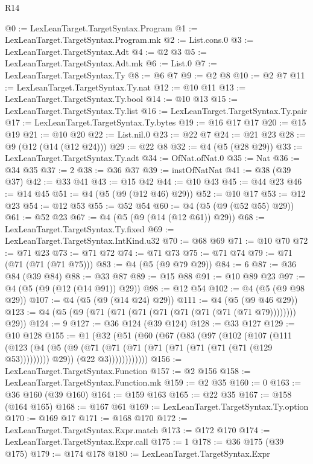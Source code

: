 \begin{lexlean}{R14}
\begin{coremodule}
@0 := LexLeanTarget.TargetSyntax.Program
@1 := LexLeanTarget.TargetSyntax.Program.mk
@2 := List.cons.{0}
@3 := LexLeanTarget.TargetSyntax.Adt
@4 := @2 @3
@5 := LexLeanTarget.TargetSyntax.Adt.mk
@6 := List.{0}
@7 := LexLeanTarget.TargetSyntax.Ty
@8 := @6 @7
@9 := @2 @8
@10 := @2 @7
@11 := LexLeanTarget.TargetSyntax.Ty.nat
@12 := @10 @11
@13 := LexLeanTarget.TargetSyntax.Ty.bool
@14 := @10 @13
@15 := LexLeanTarget.TargetSyntax.Ty.list
@16 := LexLeanTarget.TargetSyntax.Ty.pair
@17 := LexLeanTarget.TargetSyntax.Ty.bytes
@19 := @16 @17 @17
@20 := @15 @19
@21 := @10 @20
@22 := List.nil.{0}
@23 := @22 @7
@24 := @21 @23
@28 := @9 (@12 (@14 (@12 @24)))
@29 := @22 @8
@32 := @4 (@5 (@28 @29))
@33 := LexLeanTarget.TargetSyntax.Ty.adt
@34 := OfNat.ofNat.{0}
@35 := Nat
@36 := @34 @35
@37 := 2
@38 := @36 @37
@39 := instOfNatNat
@41 := @38 (@39 @37)
@42 := @33 @41
@43 := @15 @42
@44 := @10 @43
@45 := @44 @23
@46 := @14 @45
@51 := @4 (@5 (@9 (@12 @46) @29))
@52 := @10 @17
@53 := @12 @23
@54 := @12 @53
@55 := @52 @54
@60 := @4 (@5 (@9 (@52 @55) @29))
@61 := @52 @23
@67 := @4 (@5 (@9 (@14 (@12 @61)) @29))
@68 := LexLeanTarget.TargetSyntax.Ty.fixed
@69 := LexLeanTarget.TargetSyntax.IntKind.u32
@70 := @68 @69
@71 := @10 @70
@72 := @71 @23
@73 := @71 @72
@74 := @71 @73
@75 := @71 @74
@79 := @71 (@71 (@71 (@71 @75)))
@83 := @4 (@5 (@9 @79 @29))
@84 := 6
@87 := @36 @84 (@39 @84)
@88 := @33 @87
@89 := @15 @88
@91 := @10 @89 @23
@97 := @4 (@5 (@9 (@12 (@14 @91)) @29))
@98 := @12 @54
@102 := @4 (@5 (@9 @98 @29))
@107 := @4 (@5 (@9 (@14 @24) @29))
@111 := @4 (@5 (@9 @46 @29))
@123 := @4 (@5 (@9 (@71 (@71 (@71 (@71 (@71 (@71 (@71 (@71 @79)))))))) @29))
@124 := 9
@127 := @36 @124 (@39 @124)
@128 := @33 @127
@129 := @10 @128
@155 := @1
    (@32
      (@51
        (@60
          (@67
            (@83
              (@97
                (@102
                  (@107
                    (@111
                      (@123
                        (@4
                          (@5 (@9 (@71 (@71 (@71 (@71 (@71 (@71 (@71 (@71 (@129 @53))))))))) @29))
                          (@22 @3))))))))))))
@156 := LexLeanTarget.TargetSyntax.Function
@157 := @2 @156
@158 := LexLeanTarget.TargetSyntax.Function.mk
@159 := @2 @35
@160 := 0
@163 := @36 @160 (@39 @160)
@164 := @159 @163
@165 := @22 @35
@167 := @158 (@164 @165)
@168 := @167 @61
@169 := LexLeanTarget.TargetSyntax.Ty.option
@170 := @169 @17
@171 := @168 @170
@172 := LexLeanTarget.TargetSyntax.Expr.match
@173 := @172 @170
@174 := LexLeanTarget.TargetSyntax.Expr.call
@175 := 1
@178 := @36 @175 (@39 @175)
@179 := @174 @178
@180 := LexLeanTarget.TargetSyntax.Expr

\end{coremodule}
\end{lexlean}
